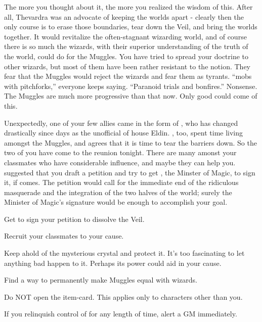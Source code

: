 \documentclass[char]{Katmeers}
\begin{document}
The more you thought about it, the more you realized the wisdom of this. After all, Thevardra was an advocate of keeping the worlds apart - clearly then the only course is to erase those boundaries, tear down the Veil, and bring the worlds together. It would revitalize the often-stagnant wizarding world, and of course there is so much the wizards, with their superior understanding of the truth of the world, could do for the Muggles. You have tried to spread your doctrine to other wizards, but most of them have been rather resistant to the notion. They fear that the Muggles would reject the wizards and fear them as tyrants. ``mobs with pitchforks,'' everyone keeps saying. ``Paranoid trials and bonfires.'' Nonsense. The Muggles are much more progressive than that now. Only good could come of this.

Unexpectedly, one of your few allies came in the form of \cMalfoy{}, who has changed drastically since \cMalfoy{\their} days as the unofficial \cMalfoy{\King} of house Eldin. \cMalfoy{\They}, too, spent time living amongst the Muggles, and \cMalfoy{\they} agrees that it is time to tear the barriers down. So the two of you have come to the reunion tonight. There are many amonst your classmates who have considerable influence, and maybe they can help you. \cMalfoy{} suggested that you draft a petition and try to get \cRon{}, the Minster of Magic, to sign it, if \cRon{\they} comes. The petition would call for the immediate end of the ridiculous masquerade and the integration of the two halves of the world; surely the Minister of Magic's signature would be enough to accomplish your goal.

\begin{itemz}[Goals]
	\item Get \cRon{} to sign your petition to dissolve the Veil.
	\item Recruit your classmates to your cause.
	\item Keep ahold of the mysterious crystal and protect it. It's too fascinating to let anything bad happen to it. Perhaps its power could aid in your cause.
	\item Find a way to permanently make Muggles equal with wizards.
\end{itemz}

\begin{itemz}[Notes]
	\item Do NOT open the \iCrystal{} item-card. This applies only to characters other than you.
	\item If you relinquish control of \iCrystal{} for any length of time, alert a GM immediately.
\end{itemz}
\end{document}
